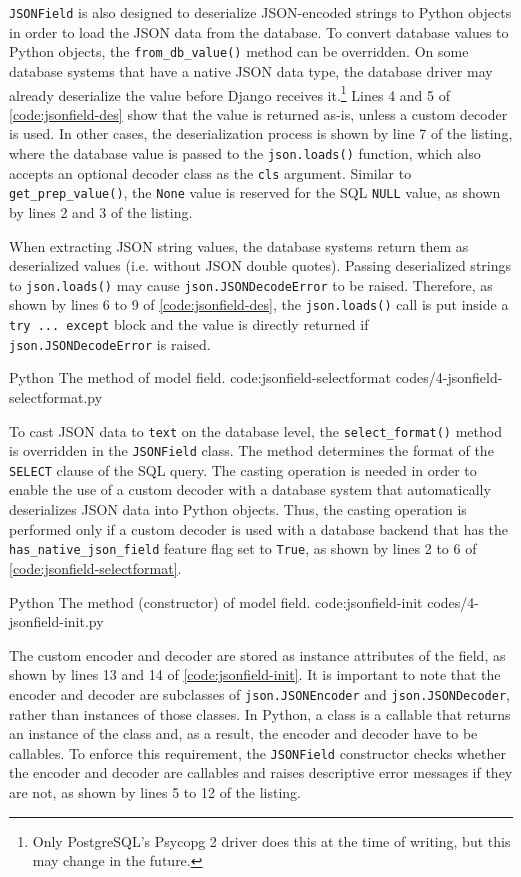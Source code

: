 \verb|JSONField| is also designed to deserialize JSON-encoded strings to Python
objects in order to load the JSON data from the database. To convert database
values to Python objects, the \verb|from_db_value()| method can be overridden.
On some database systems that have a native JSON data type, the database driver
may already deserialize the value before Django receives it.\footnote{Only
PostgreSQL's Psycopg 2 driver does this at the time of writing, but this may
change in the future.} Lines 4 and 5 of \autoref{code:jsonfield-des} show that
the value is returned as-is, unless a custom decoder is used. In other cases,
the deserialization process is shown by line 7 of the listing, where
the database value is passed to the \verb|json.loads()| function, which also
accepts an optional decoder class as the \verb|cls| argument. Similar to
\verb|get_prep_value()|, the \verb|None| value is reserved for the SQL
\verb|NULL| value, as shown by lines 2 and 3 of the listing.

When extracting JSON string values, the database systems return them as
deserialized values (i.e. without JSON double quotes). Passing deserialized
strings to \verb|json.loads()| may cause \verb|json.JSONDecodeError| to be
raised. Therefore, as shown by lines 6 to 9 of \autoref{code:jsonfield-des},
the \verb|json.loads()| call is put inside a \verb|try ... except| block and
the value is directly returned if \verb|json.JSONDecodeError| is raised.

\listing
{Python}
{The  method of  model field.}
{code:jsonfield-selectformat}
{codes/4-jsonfield-selectformat.py}

To cast JSON data to \verb|text| on the database level, the
\verb|select_format()| method is overridden in the \verb|JSONField| class. The
method determines the format of the \verb|SELECT| clause of the SQL query. The
casting operation is needed in order to enable the use of a custom decoder with
a database system that automatically deserializes JSON data into Python
objects. Thus, the casting operation is performed only if a custom decoder is
used with a database backend that has the \verb|has_native_json_field| feature
flag set to \verb|True|, as shown by lines 2 to 6 of
\autoref{code:jsonfield-selectformat}.

\listing
{Python}
{The  method (constructor) of 
model field.}
{code:jsonfield-init}
{codes/4-jsonfield-init.py}

The custom encoder and decoder are stored as instance attributes of the field,
as shown by lines 13 and 14 of \autoref{code:jsonfield-init}. It is important
to note that the encoder and decoder are subclasses of \verb|json.JSONEncoder|
and \verb|json.JSONDecoder|, rather than instances of those classes. In Python,
a class is a callable that returns an instance of the class and, as a result,
the encoder and decoder have to be callables. To enforce this requirement, the
\verb|JSONField| constructor checks whether the encoder and decoder are
callables and raises descriptive error messages if they are not, as shown by
lines 5 to 12 of the listing.

